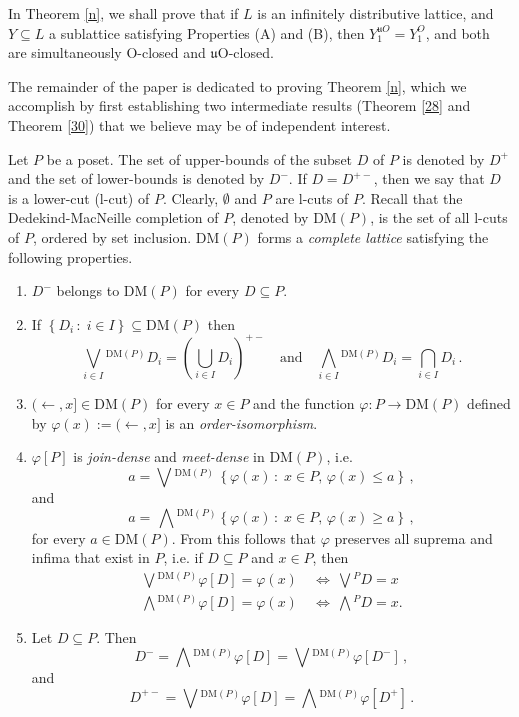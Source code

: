 \documentclass[12pt,a4paper]{amsart}
\numberwithin{equation}{section}
\theoremstyle{definition}
\newcommand{\set}[2]{\ensuremath{\left\{ #1\,:\; #2\right\}}}
\newcommand{\sss}[1]{{\scriptscriptstyle #1}}
\newcommand{\DM}{\text{DM}}
\begin{document}
In Theorem \ref{n}, we  shall prove that if $L$ is an infinitely distributive lattice, and $Y \subseteq L$ a sublattice satisfying Properties (A) and (B), then $Y^{\sss{\mathfrak{u}{O}}}_1=Y^{\sss{{O}}}_1$, and both are simultaneously O-closed and $\mathfrak{u}$O-closed.  

	
The remainder of the paper is dedicated to proving Theorem \ref{n}, which we accomplish by first establishing two intermediate results (Theorem \ref{28} and Theorem \ref{30})  that we believe may be of independent interest.

Let $P$ be a poset.  The set of upper-bounds  of the subset $ D$ of $P$  is denoted by $ D^{+}$ and the set of lower-bounds  is denoted by  $ D^{-}$.  If $D=D^{+-}$, then we say that $D$ is a lower-cut (l-cut) of $P$.  Clearly, $\emptyset$ and $P$ are l-cuts of $P$.    
Recall that the Dedekind-MacNeille completion of $ P$, denoted by $ \DM (P)$, is the set of all l-cuts of $P$, ordered by set inclusion.    $\DM (P)$ forms a \emph{complete lattice}  satisfying the following properties.
 \begin{enumerate}[{\rm(i)}]
 \item $ D^-$  belongs to $ \DM(P)$ for every $ D\subseteq P$.
 \item If $\set{ D_i}{i\in I}\subseteq \DM (P)$  then 
 \[\bigvee_{i\in I}{\!}^{\DM (P)}D_i=\left(\bigcup_{i\in I} D_i\right)^{+-}\quad\text{and}\quad\bigwedge_{i\in I}{\!}^{\DM (P)}D_{i}=\bigcap_{i\in I} D_{i}\,.\]
   \item  $(\leftarrow,x]\in \DM (P)$ for every $x\in P$ and the function $\varphi:P\to \DM(P)$ defined by $\varphi(x):=(\leftarrow,x]$ is an \emph{order-isomorphism}.
     \item $\varphi[ P]$ is \emph{join-dense} and \emph{meet-dense} in $\DM(P)$, i.e.
   \[ a =\bigvee{}^{\!{ \DM(P)}}\,\set{\varphi(x)}{x\in P,\,\varphi(x)\le  a}\,,\]
   and 
   \[ a =\, \bigwedge{}^{\! \DM(P)}\set{\varphi(x)}{x\in P,\,\varphi(x)\ge  a}\,,\]
   for every $ a\in \DM(P)$.  From this follows that  $\varphi$ preserves all suprema and infima that exist in $ P$, i.e. if $ D\subseteq P$ and $x\in P$, then 
   \begin{align*}
   \bigvee{}^{\! \DM(P)}\varphi[D]=\varphi(x)\ &\Leftrightarrow\ \bigvee{}^{\! P} D=x\\
    \bigwedge{}^{\! \DM(P)} \varphi[D]=\varphi(x)\ &\Leftrightarrow\ \bigwedge{}^{\! P}D=x.
    \end{align*}
   \item Let $D\subseteq P$.  Then
   \[ D^-=\bigwedge{}^{\! \DM(P)}\varphi[ D]=\bigvee{}^{\!{ \DM(P)}}\varphi[ D^-]\,,\]
    and 
    \[ D^{+-}=\bigvee{}^{\!{\DM(P)}}\varphi[ D]=\bigwedge{}^{\! \DM(P)}\varphi[ D^+]\,.\]
  \end{enumerate}
 
\end{document}
